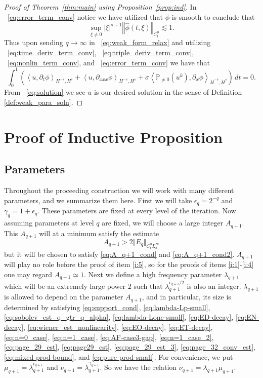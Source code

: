\documentclass[12pt,reqno,letterpaper]{amsart}
\numberwithin{equation}{section}
\newcommand{\1}{{\bf 1}}
\newcommand{\2}{{\bf 2}}
\theoremstyle{remark}
\theoremstyle{remark}
\begin{document}
\begin{proof}[Proof of Theorem~\ref{thm:main} using Proposition~\ref{prop:ind}]
In ~\eqref{eq:error_term_conv} notice we have utilized that $\phi$ is smooth to conclude that
$$
\sup_{\xi \not=0} |\xi|^{s+1} \left\Vert \hat{\phi}(t,\xi)\right\Vert_{C_t^0} \lesssim 1.
$$
Thus upon sending $q \to \infty$ in ~\eqref{eq:weak_form_relax} and utilizing ~\eqref{eq:time_deriv_term_conv}, ~\eqref{eq:triple_deriv_term_conv}, ~\eqref{eq:nonlin_term_conv}, and ~\eqref{eq:error_term_conv} we have that
\begin{equation}\label{eq:solution}
    \int_0^1 \left(\left\langle u,\partial_t\phi \right\rangle_{H^{-s},H^s} + \left\langle u,\partial_{xxx}\phi \right\rangle_{H^{-s},H^s} + \sigma \left\langle \mathbb{P}_{\not=0}\left(u^k\right), \partial_{x}\phi\right\rangle_{\dot{H}^{-s},\dot{H}^s}\right)\, dt = 0.
\end{equation}
From ~\eqref{eq:solution} we see $u$ is our desired solution in the sense of Definition \ref{def:weak_para_soln}.







\end{proof}

\section{Proof of Inductive Proposition}\label{sec:5}

\subsection{Parameters}\label{subsec:param} Throughout the proceeding construction we will work with many different parameters, and we summarize them here. First we will take $\epsilon_q = 2^{-q}$ and $\gamma_q = 1 + \epsilon_q$. These parameters are fixed at every level of the iteration. Now assuming parameters at level $q$ are fixed, we will choose a large integer $A_{q+1}$. This $A_{q+1}$ will at a minimum satisfy the estimate
$$
A_{q+1} > 2\Vert E_q \Vert_{C_t^0 L_x^\infty}
$$
but it will be chosen to satisfy \eqref{eq:A_q+1_cond} and \eqref{eq:A_q+1_cond2}. $A_{q+1}$ will play no role before the proof of item \ref{i:5}, so for the proofs of items \ref{i:1}-\ref{i:4} one may regard $A_{q+1} \simeq 1$. Next we define a high frequency parameter $\lambda_{q+1}$ which will be an extremely large power $2$ such that $\lambda_{q+1}^{\epsilon_{q+1}/2}$ is also an integer. $\lambda_{q+1}$ is allowed to depend on the parameter $A_{q+1}$, and in particular, its size is determined by satisfying \eqref{eq:support_cond}, \eqref{eq:lambda-Lp-small}, \eqref{eq:sobolev_est_q_gtr_q_alpha}, \eqref{eq:lambda-Lone-small}, \eqref{eq:ED-decay}, \eqref{eq:EN-decay}, \eqref{eq:wiener_est_nonlinearity}, \eqref{eq:EO-decay}, \eqref{eq:ET-decay}, \eqref{eq:n=0_case}, \eqref{eq:n=1_case}, \eqref{eq:AF-case3-gap}, \eqref{eq:n=1_case_2}, \eqref{eq:page_29_est}, \eqref{eq:page29_est}, \eqref{eq:page_29_est_3}, \eqref{eq:page_32_conv_est}, \eqref{eq:mixed-prod-bound}, and \eqref{eq:pure-prod-small}. For convenience, we put $\mu_{q+1} = \lambda_{q+1}^{\epsilon_{q+1}}$ and $\nu_{q+1} = \lambda_{q+1}^{\gamma_{q+1}}$. So we have the relation $\nu_{q+1} = \lambda_{q+1}\mu_{q+1}$.
\end{document}
